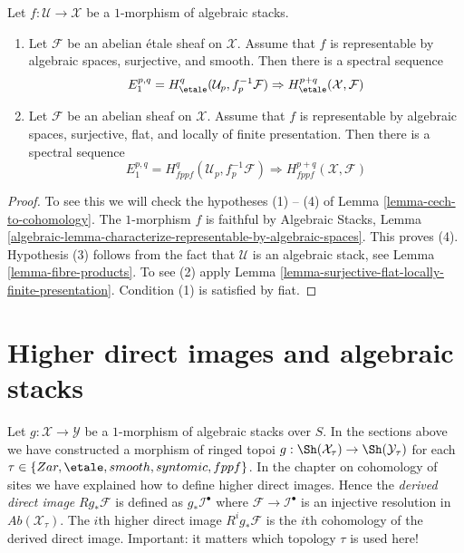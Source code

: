 \begin{proposition}
\label{proposition-smooth-covering-compute-cohomology}
Let $f : \mathcal{U} \to \mathcal{X}$ be a $1$-morphism of algebraic stacks.
\begin{enumerate}
\item Let $\mathcal{F}$ be an abelian \'etale sheaf on $\mathcal{X}$.
Assume that $f$ is representable by algebraic spaces, surjective, and smooth.
Then there is a spectral sequence
$$
E_1^{p, q} = H^q_\etale(\mathcal{U}_p, f_p^{-1}\mathcal{F})
\Rightarrow
H^{p + q}_\etale(\mathcal{X}, \mathcal{F})
$$
\item Let $\mathcal{F}$ be an abelian sheaf on $\mathcal{X}$.
Assume that $f$ is representable by algebraic spaces, surjective, flat,
and locally of finite presentation. Then there is
a spectral sequence
$$
E_1^{p, q} = H^q_{fppf}(\mathcal{U}_p, f_p^{-1}\mathcal{F})
\Rightarrow
H^{p + q}_{fppf}(\mathcal{X}, \mathcal{F})
$$
\end{enumerate}
\end{proposition}

\begin{proof}
To see this we will check the hypotheses (1) -- (4) of
Lemma \ref{lemma-cech-to-cohomology}.
The $1$-morphism $f$ is faithful by
Algebraic Stacks, Lemma
\ref{algebraic-lemma-characterize-representable-by-algebraic-spaces}.
This proves (4).
Hypothesis (3) follows from the fact that $\mathcal{U}$ is an algebraic
stack, see
Lemma \ref{lemma-fibre-products}.
To see (2) apply
Lemma \ref{lemma-surjective-flat-locally-finite-presentation}.
Condition (1) is satisfied by fiat.
\end{proof}










\section{Higher direct images and algebraic stacks}
\label{section-higher-direct-images}

\noindent
Let $g : \mathcal{X} \to \mathcal{Y}$ be a $1$-morphism of algebraic stacks
over $S$. In the sections above we have constructed a morphism of ringed
topoi $g : \Sh(\mathcal{X}_\tau) \to \Sh(\mathcal{Y}_\tau)$
for each $\tau \in \{Zar, \etale, smooth, syntomic, fppf\}$.
In the chapter on cohomology of sites we have explained how to
define higher direct images. Hence the {\it derived direct image}
$Rg_*\mathcal{F}$ is defined as $g_*\mathcal{I}^\bullet$ where
$\mathcal{F} \to \mathcal{I}^\bullet$ is an injective resolution in
$\textit{Ab}(\mathcal{X}_\tau)$. The $i$th higher direct image
$R^ig_*\mathcal{F}$ is the $i$th cohomology of the derived direct image.
Important: it matters which topology $\tau$ is used here!

